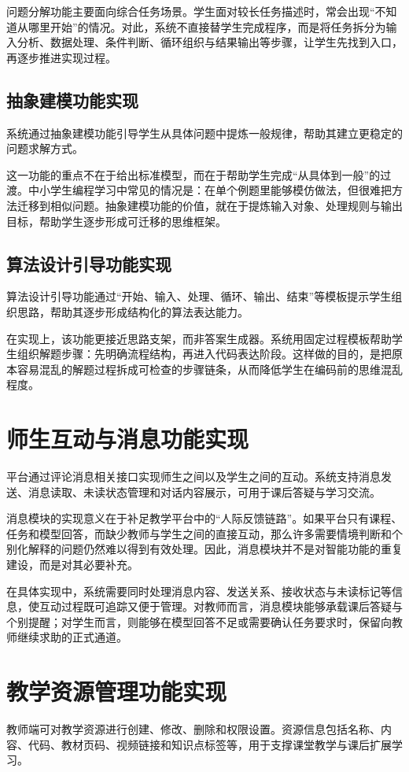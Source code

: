 问题分解功能主要面向综合任务场景。学生面对较长任务描述时，常会出现“不知道从哪里开始”的情况。对此，系统不直接替学生完成程序，而是将任务拆分为输入分析、数据处理、条件判断、循环组织与结果输出等步骤，让学生先找到入口，再逐步推进实现过程。

\subsection{抽象建模功能实现}
系统通过抽象建模功能引导学生从具体问题中提炼一般规律，帮助其建立更稳定的问题求解方式。

这一功能的重点不在于给出标准模型，而在于帮助学生完成“从具体到一般”的过渡。中小学生编程学习中常见的情况是：在单个例题里能够模仿做法，但很难把方法迁移到相似问题。抽象建模功能的价值，就在于提炼输入对象、处理规则与输出目标，帮助学生逐步形成可迁移的思维框架。

\subsection{算法设计引导功能实现}
算法设计引导功能通过“开始、输入、处理、循环、输出、结束”等模板提示学生组织思路，帮助其逐步形成结构化的算法表达能力。

在实现上，该功能更接近思路支架，而非答案生成器。系统用固定过程模板帮助学生组织解题步骤：先明确流程结构，再进入代码表达阶段。这样做的目的，是把原本容易混乱的解题过程拆成可检查的步骤链条，从而降低学生在编码前的思维混乱程度。

\section{师生互动与消息功能实现}
平台通过评论消息相关接口实现师生之间以及学生之间的互动。系统支持消息发送、消息读取、未读状态管理和对话内容展示，可用于课后答疑与学习交流。

消息模块的实现意义在于补足教学平台中的“人际反馈链路”\cite{yao2022dialogue,li2023trust}。如果平台只有课程、任务和模型回答，而缺少教师与学生之间的直接互动，那么许多需要情境判断和个别化解释的问题仍然难以得到有效处理。因此，消息模块并不是对智能功能的重复建设，而是对其必要补充。

在具体实现中，系统需要同时处理消息内容、发送关系、接收状态与未读标记等信息，使互动过程既可追踪又便于管理\cite{li2023trust}。对教师而言，消息模块能够承载课后答疑与个别提醒；对学生而言，则能够在模型回答不足或需要确认任务要求时，保留向教师继续求助的正式通道。

\section{教学资源管理功能实现}
教师端可对教学资源进行创建、修改、删除和权限设置。资源信息包括名称、内容、代码、教材页码、视频链接和知识点标签等，用于支撑课堂教学与课后扩展学习。

